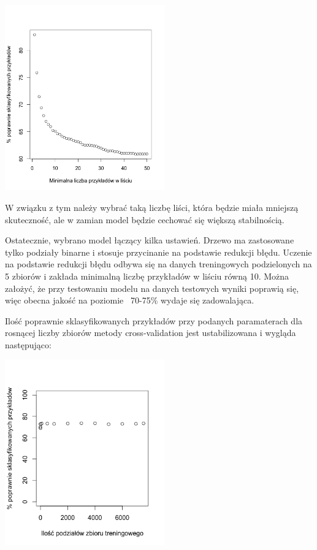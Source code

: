 \documentclass[11pt]{article} %
\begin{document}
\begin{center}
	\includegraphics[height=8cm]{binaryTree-minimumLeaf}
\end{center}

W związku z tym należy wybrać taką liczbę liści, która będzie miała mniejszą skuteczność, ale w zamian model będzie cechować się większą stabilnością.

Ostatecznie, wybrano model łączący kilka ustawień. Drzewo ma zastosowane tylko podziały binarne i stosuje przycinanie na podstawie redukcji błędu. Uczenie na podstawie redukcji błędu odbywa się na danych treningowych podzielonych na 5 zbiorów i zakłada minimalną liczbę przykładów w liściu równą 10. Można założyć, że przy testowaniu modelu na danych testowych wyniki poprawią się, więc obecna jakość na poziomie ~70-75\% wydaje się zadowalająca. 

Ilość poprawnie sklasyfikowanych przykładów przy podanych paramaterach dla rosnącej liczby zbiorów metody cross-validation jest ustabilizowana i wygląda następująco:

\begin{center}
	\includegraphics[height=8cm]{dt-cv}
\end{center}
\end{document}
